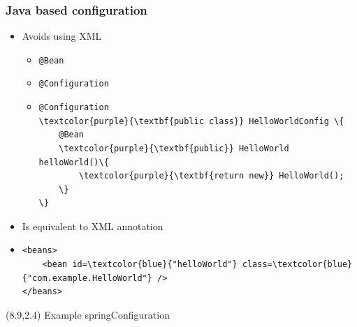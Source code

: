 \documentclass[10pt,xcolor=pdflatex, table]{beamer}
\begin{document}
\begin{frame}[fragile]\frametitle{Java based configuration}
	\begin{itemize}
		\item Avoids using XML
        \begin{itemize}
        	\item \texttt{@Bean}
        	\item \texttt{@Configuration}
            \smallskip
            \item[] \begin{Verbatim}[fontsize=\footnotesize, commandchars=\\\{\}]
@Configuration
\textcolor{purple}{\textbf{public class}} HelloWorldConfig \{
    @Bean
    \textcolor{purple}{\textbf{public}} HelloWorld helloWorld()\{
        \textcolor{purple}{\textbf{return new}} HelloWorld();
    \}
\}          
                \end{Verbatim}
        \end{itemize}
		\item Is equivalent to XML annotation
        \item[]
        	\smallskip
            \begin{Verbatim}[fontsize=\footnotesize, commandchars=\\\{\}]
<beans>
    <bean id=\textcolor{blue}{"helloWorld"} class=\textcolor{blue}{"com.example.HelloWorld"} />
</beans>
            \end{Verbatim}
	\end{itemize}
\begin{textblock}{15}(8.9,2.4)
    {\footnotesize Example springConfiguration}
\end{textblock}
\end{frame}
\end{document}
